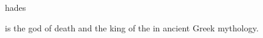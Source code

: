 \documentclass{stex}
\begin{document}
\begin{smodule}{hades}
\begin{sparagraph}[style=symdoc]
 is the god of death and the king of the
 in ancient Greek mythology.
\end{sparagraph}
\end{smodule}
\end{document}
